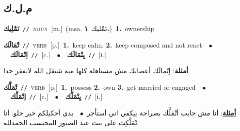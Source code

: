 \documentclass[10pt,a4paper,twoside]{article} %
\begin{document}
\begin{multicols}{2}
\vspace{-3mm}
\subsection*{\color{blue}\foreignlanguage{arabic}{م.ل.ك}\color{blue}{}} 

{\setlength\topsep{0pt}\textbf{\foreignlanguage{arabic}{تَمْلِيك}}\ {\color{gray}\texttt{//}\color{black}}\ \textsc{noun}\ [m.]\ \color{gray}(msa. \foreignlanguage{arabic}{تَمْليك}~\foreignlanguage{arabic}{\textbf{١.}})\color{black}\ \textbf{1.}~ownership\ } \vspace{2mm}

{\setlength\topsep{0pt}\textbf{\foreignlanguage{arabic}{تْمَالَك}}\ {\color{gray}\texttt{//}\color{black}}\ \textsc{verb}\ [p.]\ \textbf{1.}~keep calm.  \textbf{2.}~keep composed and not react\ \ $\bullet$\ \ \setlength\topsep{0pt}\textbf{\foreignlanguage{arabic}{اِتْمَالَك}}\ {\color{gray}\texttt{//}\color{black}}\ [c.]\ \ $\bullet$\ \ \setlength\topsep{0pt}\textbf{\foreignlanguage{arabic}{يِتْمَالَك}}\ {\color{gray}\texttt{//}\color{black}}\ [i.]\  \begin{flushright}\color{gray}\foreignlanguage{arabic}{\textbf{\underline{\foreignlanguage{arabic}{أمثلة}}}: اِتْمالَك أعصابك مش مستاهلة كلها مية شيقل الله لايفقر حدا}\end{flushright}\color{black}} \vspace{2mm}

{\setlength\topsep{0pt}\textbf{\foreignlanguage{arabic}{تْمَلَّك}}\ {\color{gray}\texttt{//}\color{black}}\ \textsc{verb}\ [p.]\ \textbf{1.}~possess  \textbf{2.}~own  \textbf{3.}~get married or engaged\ \ $\bullet$\ \ \setlength\topsep{0pt}\textbf{\foreignlanguage{arabic}{اِتْمَلَّك}}\ {\color{gray}\texttt{//}\color{black}}\ [c.]\ \ $\bullet$\ \ \setlength\topsep{0pt}\textbf{\foreignlanguage{arabic}{يِتْمَلَّك}}\ {\color{gray}\texttt{//}\color{black}}\ [i.]\  \begin{flushright}\color{gray}\foreignlanguage{arabic}{\textbf{\underline{\foreignlanguage{arabic}{أمثلة}}}: أنا مش حابب أتْمَلَّك بصراحة بيكفي اني أستأجر\ $\bullet$\ \  بدي أحكيلكم خبر حلو. أنا تْمَلَّكِت على بنت عبد الصبور المحتسب الحمدلله.}\end{flushright}\color{black}} \vspace{2mm}


\end{multicols}
\end{document}
